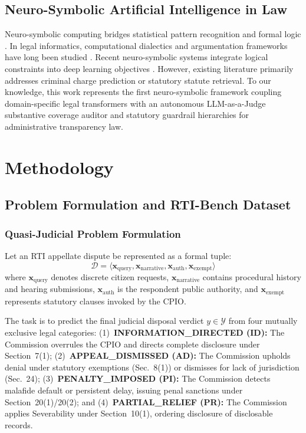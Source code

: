 \documentclass[conference]{IEEEtran}
\begin{document}
\subsection{Neuro-Symbolic Artificial Intelligence in Law}
Neuro-symbolic computing bridges statistical pattern recognition and formal logic \cite{garcez2023neurosymbolic, deraedt2020statistical, besold2017neural}. In legal informatics, computational dialectics and argumentation frameworks have long been studied \cite{sartor2005legal, bench2011using}. Recent neuro-symbolic systems integrate logical constraints into deep learning objectives \cite{giunchiglia2020multi}. However, existing literature primarily addresses criminal charge prediction or statutory statute retrieval. To our knowledge, this work represents the first neuro-symbolic framework coupling domain-specific legal transformers with an autonomous LLM-as-a-Judge substantive coverage auditor and statutory guardrail hierarchies for administrative transparency law.

\section{Methodology}
\subsection{Problem Formulation and RTI-Bench Dataset}
\subsubsection{Quasi-Judicial Problem Formulation}
Let an RTI appellate dispute be represented as a formal tuple:
\begin{equation}
\mathcal{D} = \langle \mathbf{x}_{\text{query}}, \mathbf{x}_{\text{narrative}}, \mathbf{x}_{\text{auth}}, \mathbf{x}_{\text{exempt}} \rangle
\end{equation}
where $\mathbf{x}_{\text{query}}$ denotes discrete citizen requests, $\mathbf{x}_{\text{narrative}}$ contains procedural history and hearing submissions, $\mathbf{x}_{\text{auth}}$ is the respondent public authority, and $\mathbf{x}_{\text{exempt}}$ represents statutory clauses invoked by the CPIO.

The task is to predict the final judicial disposal verdict $y \in \mathcal{Y}$ from four mutually exclusive legal categories:
(1)~\textbf{INFORMATION\_DIRECTED (ID):} The Commission overrules the CPIO and directs complete disclosure under Section~7(1);
(2)~\textbf{APPEAL\_DISMISSED (AD):} The Commission upholds denial under statutory exemptions (Sec.~8(1)) or dismisses for lack of jurisdiction (Sec.~24);
(3)~\textbf{PENALTY\_IMPOSED (PI):} The Commission detects malafide default or persistent delay, issuing penal sanctions under Section~20(1)/20(2); and
(4)~\textbf{PARTIAL\_RELIEF (PR):} The Commission applies Severability under Section~10(1), ordering disclosure of disclosable records.
\end{document}

